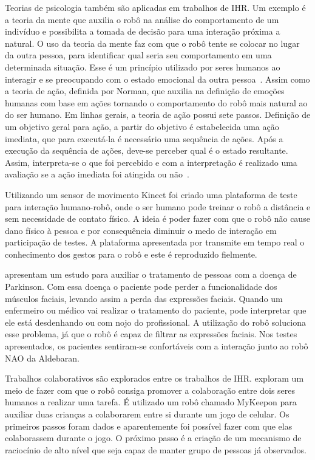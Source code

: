Teorias de psicologia também são aplicadas em trabalhos de IHR. Um exemplo é a teoria da mente que auxilia o robô na análise do comportamento de um indivíduo e possibilita a tomada de decisão para uma interação próxima a natural. O uso da teoria da mente faz com que o robô tente se colocar no lugar da outra pessoa, para identificar qual seria seu comportamento em uma determinada situação. Esse é um princípio utilizado por seres humanos ao interagir e se preocupando com o estado emocional da outra pessoa~\cite{hiatt:2011}. Assim como a teoria de ação, definida por Norman, que auxilia na definição de emoções humanas com base em ações tornando o comportamento do robô mais natural ao do ser humano. Em linhas gerais, a teoria de ação possui sete passos. Definição de um objetivo geral para ação, a partir do objetivo é estabelecida uma ação imediata, que para executá-la é necessário uma sequência de ações. Após a execução da sequência de ações, deve-se perceber qual é o estado resultante. Assim, interpreta-se o que foi percebido e com a interpretação é realizado uma avaliação se a ação imediata foi atingida ou não~\cite{toumi:2013}.

Utilizando um sensor de movimento Kinect foi criado uma plataforma de teste para interação humano-robô, onde o ser humano pode treinar o robô a distância e sem necessidade de contato físico. A ideia é poder fazer com que o robô não cause dano físico à pessoa e por consequência diminuir o medo de interação em participação de testes. A plataforma apresentada por \textcite{rossmann:2013} transmite em tempo real o conhecimento dos gestos para o robô e este é reproduzido fielmente.

\textcite{briggs:2015} apresentam um estudo para auxiliar o tratamento de pessoas com a doença de Parkinson. Com essa doença o paciente pode perder a funcionalidade dos músculos faciais, levando assim a perda das expressões faciais. Quando um enfermeiro ou médico vai realizar o tratamento do paciente, pode interpretar que ele está desdenhando ou com nojo do profissional. A utilização do robô soluciona esse problema, já que o robô é capaz de filtrar as expressões faciais. Nos testes apresentados, os pacientes sentiram-se confortáveis com a interação junto ao robô NAO da Aldebaran.

Trabalhos colaborativos são explorados entre os trabalhos de IHR. \textcite{strohkorb:2016} exploram um meio de fazer com que o robô consiga promover a colaboração entre dois seres humanos a realizar uma tarefa. É utilizado um robô chamado MyKeepon para auxiliar duas crianças a colaborarem entre si durante um jogo de celular. Os primeiros passos foram dados e aparentemente foi possível fazer com que elas colaborassem durante o jogo. O próximo passo é a criação de um mecanismo de raciocínio de alto nível que seja capaz de manter grupo de pessoas já observados.

